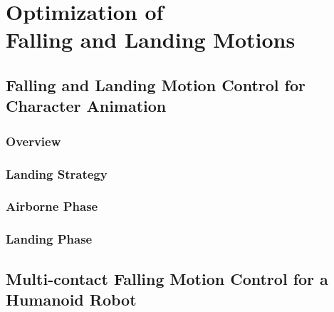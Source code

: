 \chapter{Optimization of \protect\\ Falling and Landing Motions}

\section{Falling and Landing Motion Control for Character Animation}

\subsection{Overview}

\subsection{Landing Strategy}

\subsection{Airborne Phase}

\subsection{Landing Phase}

\section{Multi-contact Falling Motion Control for a Humanoid Robot}
